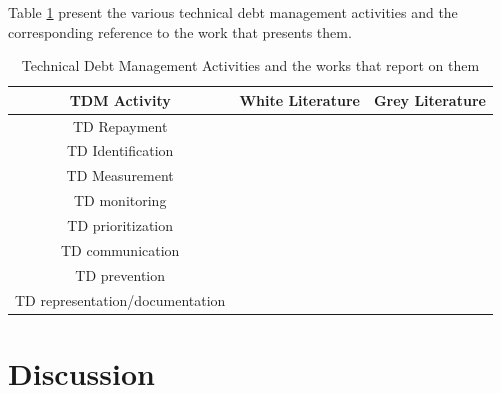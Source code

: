 Table \ref{tab:TDMactivities} present the various technical debt management activities and the corresponding reference to the work that presents them.

\begin{table}[h!]

\centering
\begin{tabular}{|c|c|c|}
    \hline
    TDM Activity & White Literature & Grey Literature \\ \hline
    TD Repayment &~\cite{10.1145/3084226.3084248, 10.1145/3387906.3388623} &  \\ \hline
    TD Identification &~\cite{Klotins2018/3183519.3183539, CicoTradeoffs} & \\ \hline
    TD Measurement & &~\cite{Qualityv77:online, Whopayso60:online}\\ \hline
    TD monitoring &~\cite{Besker2018} & \\ \hline
 TD prioritization & ~\cite{9820390} &~\cite{techolut25:online, HowtoGet43:online}\\ \hline
TD communication & &~\cite{FowlerBottlenecks} \\ \hline
TD prevention &~\cite{SanchezGordon2016} &~\cite{Creating18:online}\\ \hline
TD representation/documentation &~\cite{Chicote:2017} & \\ \hline
    \end{tabular}

\caption{Technical Debt Management Activities and the works that report on them}
  \label{tab:TDMactivities}
\end{table}

\section{Discussion}\label{Sec:Discussion}





